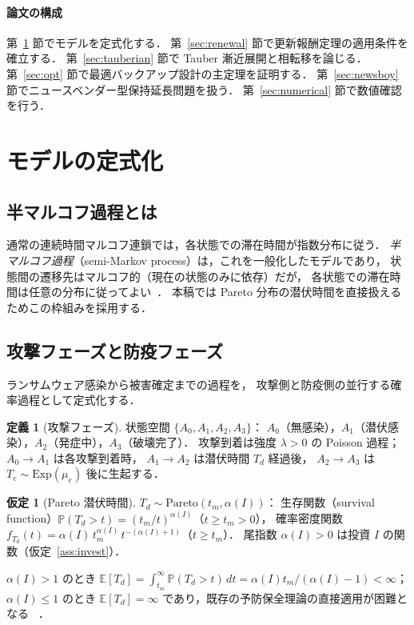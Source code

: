 \documentclass[12pt,a4paper]{article}
\theoremstyle{plain}
\theoremstyle{definition}
\newtheorem{definition}[theorem]{定義}
\newtheorem{assumption}[theorem]{仮定}
\theoremstyle{remark}
\newcommand{\E}{\mathbb{E}}
\newcommand{\Prob}{\mathbb{P}}
\newcommand{\alphI}{\alpha(I)}
\begin{document}
\paragraph{論文の構成}
第~\ref{sec:model} 節でモデルを定式化する．
第~\ref{sec:renewal} 節で更新報酬定理の適用条件を確立する．
第~\ref{sec:tauberian} 節で Tauber 漸近展開と相転移を論じる．
第~\ref{sec:opt} 節で最適バックアップ設計の主定理を証明する．
第~\ref{sec:newsboy} 節でニュースベンダー型保持延長問題を扱う．
第~\ref{sec:numerical} 節で数値確認を行う．

\section{モデルの定式化}
\label{sec:model}

\subsection{半マルコフ過程とは}

\begin{tcolorbox}[mathbox, title={半マルコフ過程（Semi-Markov Process）の概念}]
通常の連続時間マルコフ連鎖では，各状態での滞在時間が指数分布に従う．
\emph{半マルコフ過程}（semi-Markov process）は，これを一般化したモデルであり，
状態間の遷移先はマルコフ的（現在の状態のみに依存）だが，
各状態での滞在時間は任意の分布に従ってよい~\cite{cinlar1975,limnios2001,howard1971}．
本稿では Pareto 分布の潜伏時間を直接扱えるためこの枠組みを採用する．
\end{tcolorbox}

\subsection{攻撃フェーズと防疫フェーズ}

ランサムウェア感染から被害確定までの過程を，
攻撃側と防疫側の並行する確率過程として定式化する．

\begin{definition}[攻撃フェーズ]\label{def:attack}
状態空間 $\{A_0,A_1,A_2,A_3\}$：
$A_0$（無感染），$A_1$（潜伏感染），$A_2$（発症中），$A_3$（破壊完了）．
攻撃到着は強度 $\lambda>0$ の Poisson 過程；
$A_0\to A_1$ は各攻撃到着時，
$A_1\to A_2$ は潜伏時間 $T_d$ 経過後，
$A_2\to A_3$ は $T_e\sim\mathrm{Exp}(\mu_e)$ 後に生起する．
\end{definition}

\begin{assumption}[Pareto 潜伏時間]\label{ass:pareto}
$T_d\sim\mathrm{Pareto}(t_m,\alphI)$：
生存関数（survival function）$\Prob(T_d>t)=(t_m/t)^{\alphI}$（$t\ge t_m>0$），
確率密度関数 $f_{T_d}(t)=\alphI\,t_m^{\alphI}\,t^{-(\alphI+1)}$（$t\ge t_m$）．
尾指数 $\alphI>0$ は投資 $I$ の関数（仮定~\ref{ass:invest}）．

$\alphI>1$ のとき $\E[T_d]=\int_{t_m}^\infty\Prob(T_d>t)\,dt=\alphI t_m/(\alphI-1)<\infty$；
$\alphI\le1$ のとき $\E[T_d]=\infty$ であり，既存の予防保全理論の直接適用が困難となる
~\cite{embrechts1997,dehaan2006}．
\end{assumption}
\end{document}
